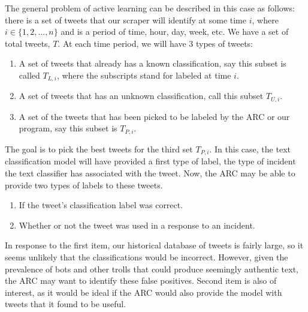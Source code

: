 \documentclass[titlepage, 12pt]{article}
\begin{document}
\hspace{0.5 cm}The general problem of active learning can be described in this case as follows: there is a set of tweets that our scraper will identify at some time $i$, where $i \in \{1, 2,..., n\}$ and is a period of time, hour, day, week, etc. We have a set of total tweets, $T$. At each time period, we will have 3 types of tweets:
\begin{enumerate}
    \item A set of tweets that already has a known classification, say this subset is called $T_{L,i}$, where the subscripts stand for labeled at time $i$.
    \item A set of tweets that has an unknown classification, call this subset $T_{U,i}$.
    \item A set of the tweets that has been picked to be labeled by the ARC or our program, say this subset is $T_{P,i}$.
\end{enumerate}
The goal is to pick the best tweets for the third set $T_{P,i}$. In this case, the text classification model will have provided a first type of label, the type of incident the text classifier has associated with the tweet. Now, the ARC may be able to provide two types of labels to these tweets.
\begin{enumerate}
    \item If the tweet's classification label was correct.
    \item Whether or not the tweet was used in a response to an incident.
\end{enumerate}
In response to the first item, our historical database of tweets is fairly large, so it seems unlikely that the classifications would be incorrect. However, given the prevalence of bots and other trolls that could produce seemingly authentic text, the ARC may want to identify these false positives. Second item is also of interest, as it would be ideal if the ARC would also provide the model with tweets that it found to be useful. 
\end{document}
